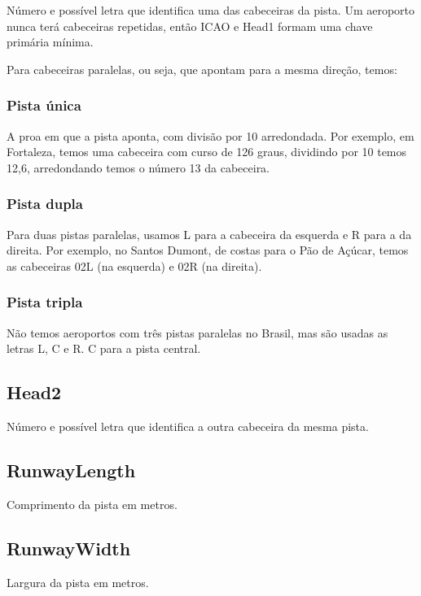 Número e possível letra que identifica uma das cabeceiras da pista. Um aeroporto nunca terá
cabeceiras repetidas, então ICAO e Head1 formam uma chave primária mínima.

Para cabeceiras paralelas, ou seja, que apontam para a mesma direção, temos:

\subsubsection{Pista única}

A proa em que a pista aponta, com divisão por 10 arredondada. Por exemplo, em Fortaleza,
temos uma cabeceira com curso de 126 graus, dividindo por 10 temos 12,6, arredondando
temos o número 13 da cabeceira.

\subsubsection{Pista dupla}

Para duas pistas paralelas, usamos L para a cabeceira da esquerda e R para a da direita.
Por exemplo, no Santos Dumont, de costas para o Pão de Açúcar, temos as cabeceiras 02L 
(na esquerda) e 02R (na direita).

\subsubsection{Pista tripla}

Não temos aeroportos com três pistas paralelas no Brasil, mas são usadas as letras
L, C e R. C para a pista central.

\subsection{Head2}

Número e possível letra que identifica a outra cabeceira da mesma pista.

\subsection{RunwayLength}

Comprimento da pista em metros.

\subsection{RunwayWidth}

Largura da pista em metros.

